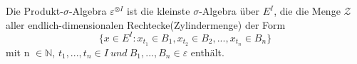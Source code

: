 Die Produkt-$\sigma$-Algebra $\varepsilon^{ \otimes I}$ ist die kleinste $\sigma$-Algebra über $E^{I}$, die die Menge $\mathcal{Z}$ aller endlich-dimensionalen Rechtecke(Zylindermenge) der Form
\begin{equation*}
\lbrace x \in E^{I} : x_{t_{1}} \in B_{1}, x_{t_{2}} \in B_{2},..., x_{t_{n}} \in B_{n}   \rbrace 
\end{equation*}
mit n $\in \mathbb{N}$, $t_{1},..., t_{n} \in I \: und \:B_{1},...,B_{n} \in \varepsilon $ enthält.